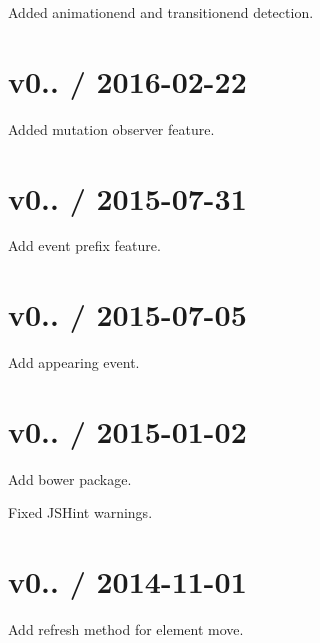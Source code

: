
\begin{DoxyItemize}
\item Added animationend and transitionend detection.
\end{DoxyItemize}

\section*{v0.. / 2016-\/02-\/22}


\begin{DoxyItemize}
\item Added mutation observer feature.
\end{DoxyItemize}

\section*{v0.. / 2015-\/07-\/31}


\begin{DoxyItemize}
\item Add event prefix feature.
\end{DoxyItemize}

\section*{v0.. / 2015-\/07-\/05}


\begin{DoxyItemize}
\item Add appearing event.
\end{DoxyItemize}

\section*{v0.. / 2015-\/01-\/02}


\begin{DoxyItemize}
\item Add bower package.
\item Fixed J\+S\+Hint warnings.
\end{DoxyItemize}

\section*{v0.. / 2014-\/11-\/01}


\begin{DoxyItemize}
\item Add refresh method for element move.
\end{DoxyItemize}

